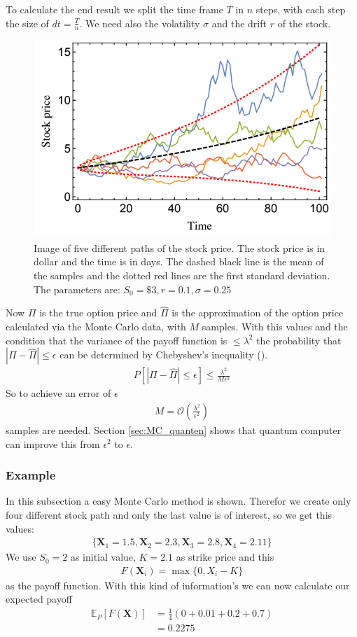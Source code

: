 To calculate the end result we split the time frame $T$ in $n$ steps, with each step the size of $dt=\frac{T}{n}$. We need also the volatility $\sigma$ and the drift $r$ of the stock.
\begin{figure}[H]
  \begin{center}
    \includegraphics[width=0.5\linewidth]{images/stock_path.png}
  \end{center}
  \caption{Image of five different paths of the stock price. The stock price is in dollar and the time is in days. The dashed black line is the mean of the samples and the dotted red lines are the first standard deviation. The parameters are: $S_0=\$3, r=0.1, \sigma=0.25$ \cite{1805.00109}}
  \label{fig:stockPaths}
\end{figure}
Now $\Pi$ is the true option price and $\hat{\Pi}$ is the approximation of the option price calculated via the Monte Carlo data, with $M$ samples. With this values and the condition that the variance of the payoff function is $ \leq \lambda^2$ the probability that $|\Pi-\hat{\Pi}| \leq \epsilon$ can be determined by Chebyshev’s inequality (\cite{1504.06987}).
\begin{align}
	        P[|\Pi-\hat{\Pi}| \leq \epsilon] \leq \frac{\lambda^2}{M\epsilon^2}
	    \end{align}
So to achieve an error of $\epsilon$
\begin{align}
	        M=\mathcal{O}(\frac{\lambda^2}{\epsilon^2}) \label{eq:classic_M}
	    \end{align}
samples are needed. Section \ref{sec:MC_quanten} shows that quantum computer can improve this from $\epsilon^2$ to $\epsilon$.

\subsubsection{Example} \label{seq:MC_example}
In this subsection a easy Monte Carlo method is shown. Therefor we create only four different stock path and only the last value is of interest, so we get this values:
\begin{align}
    \{\textbf{X}_1=1.5, \textbf{X}_2=2.3, \textbf{X}_3=2.8, \textbf{X}_4=2.11\} \nonumber
\end{align}
We use $S_0=2$ as initial value, $K=2.1$ as strike price and this
\begin{align}
    F(\textbf{X}_i) = \max\{0, X_i - K\} \label{eq:MC_example_european}
\end{align}
as the payoff function. With this kind of information's we can now calculate our expected payoff
\begin{align}
    \mathbb{E}_P[F(\textbf{X})] &= \frac{1}{4}(0+0.01+0.2+0.7 ) \nonumber \\
    &= 0.2275 \nonumber
\end{align}
